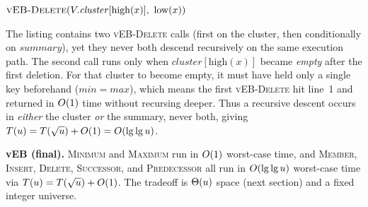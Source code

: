 \begin{algorithm}[H]
\caption{\textsc{vEB-Delete}($V, x$)}
$\textsc{vEB-Delete}(V.\mathit{cluster}[\mathrm{high}(x)],\ \mathrm{low}(x))$\;
\end{algorithm}

The listing contains two \textsc{vEB-Delete} calls (first on the cluster, then conditionally on $\mathit{summary}$), yet they never both descend recursively on the same execution path. The second call runs only when $\mathit{cluster}[\mathrm{high}(x)]$ became \emph{empty} after the first deletion. For that cluster to become empty, it must have held only a single key beforehand ($\mathit{min} = \mathit{max}$), which means the first \textsc{vEB-Delete} hit line~1 and returned in $O(1)$ time without recursing deeper. Thus a recursive descent occurs in \emph{either} the cluster \emph{or} the summary, never both, giving $T(u) = T(\sqrt{u}) + O(1) = O(\lg\lg u)$.

\begin{complexitybox}
\textbf{vEB (final).} \textsc{Minimum} and \textsc{Maximum} run in $O(1)$ worst-case time, and \textsc{Member}, \textsc{Insert},
\textsc{Delete}, \textsc{Successor}, and
\textsc{Predecessor} all run in $O(\lg\lg u)$ worst-case time via
$T(u) = T(\sqrt{u}) + O(1)$. The tradeoff is $\Theta(u)$ space (next
section) and a fixed integer universe.
\end{complexitybox}

